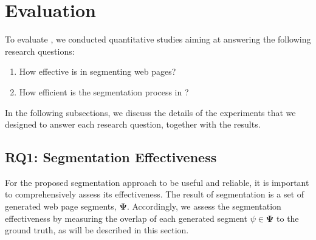 

\section{Evaluation}
\label{section:evaluation}
To evaluate \toolname, we conducted quantitative
studies aiming at answering the following research questions:\\

\begin{enumerate}[label=\textbf{RQ\arabic*},leftmargin=*]
    \item How effective is \toolname in segmenting web pages?
    \item How efficient is the segmentation process in \toolname?
\end{enumerate}

In the following subsections, we discuss the details of the experiments
that we designed to answer each research question,
together with the results.

\subsection{RQ1: Segmentation Effectiveness}
\label{sec:rq-effectiveness}
For the proposed segmentation approach to be useful and reliable,
it is important to comprehensively assess its effectiveness.
The result of segmentation is a set of 
generated web page segments, $\mathbf{\Psi}$.
Accordingly, we assess the segmentation effectiveness by 
measuring the overlap of each generated segment $\psi \in \mathbf{\Psi}$ to the ground truth,
as will be described in this section.

